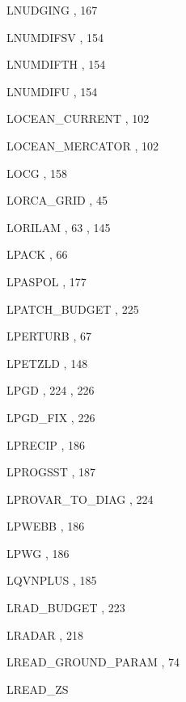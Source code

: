\begin{theindex}
  \item LNUDGING
    \subitem {},  167
  \item LNUMDIFSV
    \subitem {},  154
  \item LNUMDIFTH
    \subitem {},  154
  \item LNUMDIFU
    \subitem {},  154
  \item LOCEAN\_CURRENT
    \subitem {},  102
  \item LOCEAN\_MERCATOR
    \subitem {},  102
  \item LOCG
    \subitem {},  158
  \item LORCA\_GRID
    \subitem {},  45
  \item LORILAM
    \subitem {},  63
    \subitem {},  145
  \item LPACK
    \subitem {},  66
  \item LPASPOL
    \subitem {},  177
  \item LPATCH\_BUDGET
    \subitem {},  225
  \item LPERTURB
    \subitem {},  67
  \item LPETZLD
    \subitem {},  148
  \item LPGD
    \subitem {},  224
    \subitem {},  226
  \item LPGD\_FIX
    \subitem {},  226
  \item LPRECIP
    \subitem {},  186
  \item LPROGSST
    \subitem {},  187
  \item LPROVAR\_TO\_DIAG
    \subitem {},  224
  \item LPWEBB
    \subitem {},  186
  \item LPWG
    \subitem {},  186
  \item LQVNPLUS
    \subitem {},  185
  \item LRAD\_BUDGET
    \subitem {},  223
  \item LRADAR
    \subitem {},  218
  \item LREAD\_GROUND\_PARAM
    \subitem {},  74
  \item LREAD\_ZS

\end{theindex}
